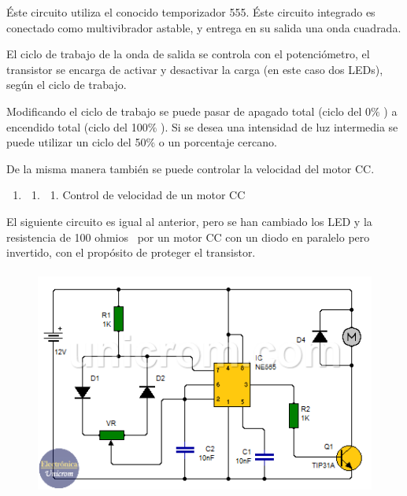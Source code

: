 \documentclass[12pt]{article}
\begin{document}
\vspace{\baselineskip}
Éste circuito utiliza el conocido temporizador 555. Éste circuito integrado es conectado como multivibrador astable, y entrega en su salida una onda cuadrada.\par

El ciclo de trabajo de la onda de salida se controla con el potenciómetro, el transistor se encarga de activar y desactivar la carga (en este caso dos LEDs), según el ciclo de trabajo.\par

Modificando el ciclo de trabajo se puede pasar de apagado total (ciclo del 0$\%$ ) a encendido total (ciclo del 100$\%$ ). Si se desea una intensidad de luz intermedia se puede utilizar un ciclo del 50$\%$  o un porcentaje cercano.\par

De la misma manera también se puede controlar la velocidad del motor CC.\par

\begin{enumerate}
	\item \begin{enumerate}
	\item \begin{enumerate}
	\item \textcolor[HTML]{0066B3}{Control de velocidad de un motor CC}
\end{enumerate}
\end{enumerate}
\end{enumerate}\par

El siguiente circuito es igual al anterior, pero se han cambiado los LED y la resistencia de 100 ohmios  por un motor CC con un diodo en paralelo pero invertido, con el propósito de proteger el transistor.\par




\begin{figure}[H]
	\begin{Center}
		\includegraphics[width=4.62in,height=2.96in]{./media/image4.png}
	\end{Center}
\end{figure}
\end{document}
